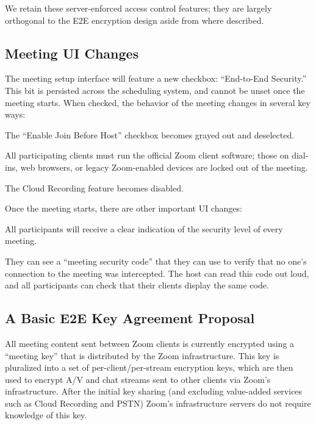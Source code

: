 We retain these server-enforced access control features; they are largely orthogonal to the E2E encryption design aside from where described.

\subsection{Meeting UI Changes}

The meeting setup interface will feature a new checkbox: ``End-to-End Security.''  This bit is persisted across the scheduling system, and cannot be unset once the meeting starts. When checked, the behavior of the meeting changes in several key ways:

\begin{itemize*}
\item The ``Enable Join Before Host'' checkbox becomes grayed out and deselected.
\item All participating clients must run the official Zoom client software; those on dial-ins, web browsers, or legacy Zoom-enabled devices are locked out of the meeting.
\item The Cloud Recording feature becomes disabled.
\end{itemize*}

Once the meeting starts, there are other important UI changes:

\begin{itemize*}
\item All participants will receive a clear indication of the security level of every meeting.
\item They can see a ``meeting security code'' that they can use to verify that no one's connection to the meeting was intercepted. The host can read this code out loud, and all participants can check that their clients display the same code.


\end{itemize*}

\subsection{A Basic E2E Key Agreement Proposal}

All meeting content sent between Zoom clients is currently encrypted using a ``meeting key'' that is distributed by the Zoom infrastructure. This key is pluralized into a set of per-client/per-stream encryption keys, which are then used to encrypt A/V and chat streams sent to other clients via Zoom's infrastructure. After the initial key sharing (and excluding value-added services such as Cloud Recording and PSTN) Zoom's infrastructure servers do not require knowledge of this key.

